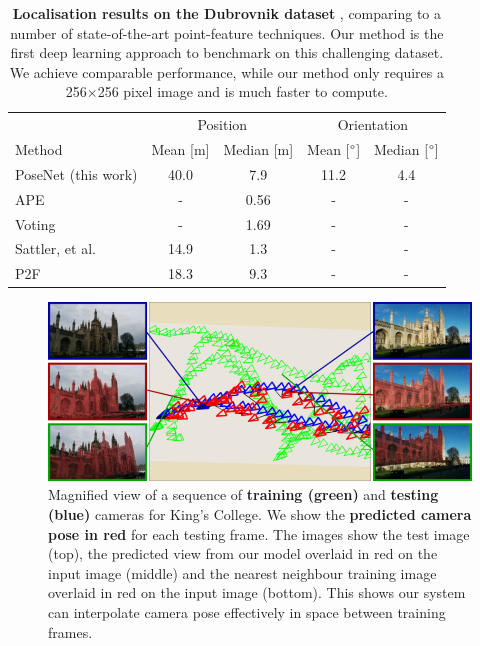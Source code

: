 \begin{table}[t]
	\centering
	\begin{tabular}{l|cc|cc}
		& \multicolumn{2}{c|}{Position} & \multicolumn{2}{c}{Orientation} \\
		Method & Mean [m] & Median [m] & Mean [$\degree$] & Median [$\degree$] \\ \hline \hline
		PoseNet (this work) & 40.0 & 7.9 & 11.2 & 4.4 \\
		APE \citep{svarm2014accurate} & - & 0.56 & - & - \\
		Voting \citep{zeisl2015camera} & - & 1.69 & - & - \\
		Sattler, et al. \citep{sattler2011fast} & 14.9 & 1.3 & - & - \\
		P2F \citep{li2010location} & 18.3 & 9.3 & - & - \\
	\end{tabular}
	\caption[Localisation results for the Dubrovnik dataset.]{\textbf{Localisation results on the Dubrovnik dataset} \citep{li2012worldwide}, comparing to a number of state-of-the-art point-feature techniques. Our method is the first deep learning approach to benchmark on this challenging dataset. We achieve comparable performance, while our method only requires a 256$\times$256 pixel image and is much faster to compute.}
	\label{tbl:dubrovnik_results}
\end{table}




\begin{figure}[t]
   	\includegraphics[width=\linewidth]{ICCV/zoominmap}
   \caption[Localisation results over train and test sequences.]{Magnified view of a sequence of \textbf{training (green)} and \textbf{testing (blue)} cameras for King's College. We show the \textbf{predicted camera pose in red} for each testing frame. The images show the test image (top), the predicted view from our model overlaid in red on the input image (middle) and the nearest neighbour training image overlaid in red on the input image (bottom). This shows our system can interpolate camera pose effectively in space between training frames.}
\label{fig:zoommap}
\end{figure}

